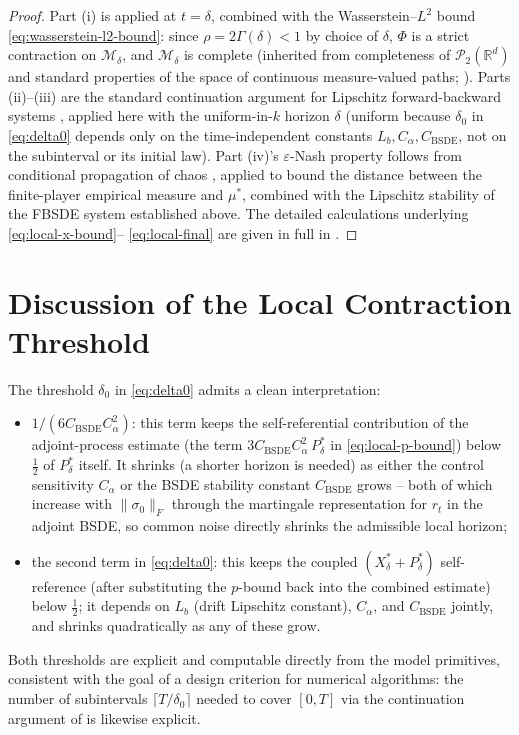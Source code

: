 \documentclass[11pt]{article}
\theoremstyle{remark}
\begin{document}
\begin{proof}
Part (i) is  applied at $t=\delta$, combined with the
Wasserstein--$L^2$ bound \eqref{eq:wasserstein-l2-bound}: since $\rho=2\Gamma(\delta)
< 1$ by choice of $\delta$, $\Phi$ is a strict contraction on $\mathcal{M}_\delta$,
and $\mathcal{M}_\delta$ is complete (inherited from completeness of
$\mathcal{P}_2(\mathbb{R}^d)$ and standard properties of the space of continuous
measure-valued paths; \citealp{billingsley1999}). Parts (ii)--(iii) are the standard
continuation argument for Lipschitz forward-backward systems
\citep[cf.][]{peng1999,ahuja2016}, applied here with the uniform-in-$k$ horizon
$\delta$ (uniform because $\delta_0$ in \eqref{eq:delta0} depends only on the
time-independent constants $L_b, C_\alpha, C_{\mathrm{BSDE}}$, not on the
subinterval or its initial law). Part (iv)'s $\varepsilon$-Nash property follows
from conditional propagation of chaos \citep[Vol.~II, Thm.~6.16]{carmonadelarue2018},
applied to bound the distance between the finite-player empirical measure and
$\mu^*$, combined with the Lipschitz stability of the FBSDE system established
above. The detailed calculations underlying \eqref{eq:local-x-bound}--%
\eqref{eq:local-final} are given in full in .
\end{proof}

\section{Discussion of the Local Contraction Threshold}
\label{sec:discussion}

The threshold $\delta_0$ in \eqref{eq:delta0} admits a clean interpretation:
\begin{itemize}
    \item $1/(6C_{\mathrm{BSDE}}C_\alpha^2)$: this term keeps the self-referential
    contribution of the adjoint-process estimate (the term
    $3C_{\mathrm{BSDE}}C_\alpha^2\,P^*_\delta$ in \eqref{eq:local-p-bound}) below
    $\tfrac12$ of $P^*_\delta$ itself. It shrinks (a shorter horizon is needed) as
    either the control sensitivity $C_\alpha$ or the BSDE stability constant
    $C_{\mathrm{BSDE}}$ grows -- both of which increase with $\|\sigma_0\|_F$
    through the martingale representation for $r_t$ in the adjoint BSDE, so common
    noise directly shrinks the admissible local horizon;
    \item the second term in \eqref{eq:delta0}: this keeps the coupled
    $(X^*_\delta+P^*_\delta)$ self-reference (after substituting the $p$-bound back
    into the combined estimate) below $\tfrac12$; it depends on $L_b$ (drift
    Lipschitz constant), $C_\alpha$, and $C_{\mathrm{BSDE}}$ jointly, and shrinks
    quadratically as any of these grow.
\end{itemize}
Both thresholds are explicit and computable directly from the model primitives,
consistent with the goal of a design criterion for numerical algorithms: the number
of subintervals $\lceil T/\delta_0\rceil$ needed to cover $[0,T]$ via the
continuation argument of  is likewise explicit.
\end{document}
